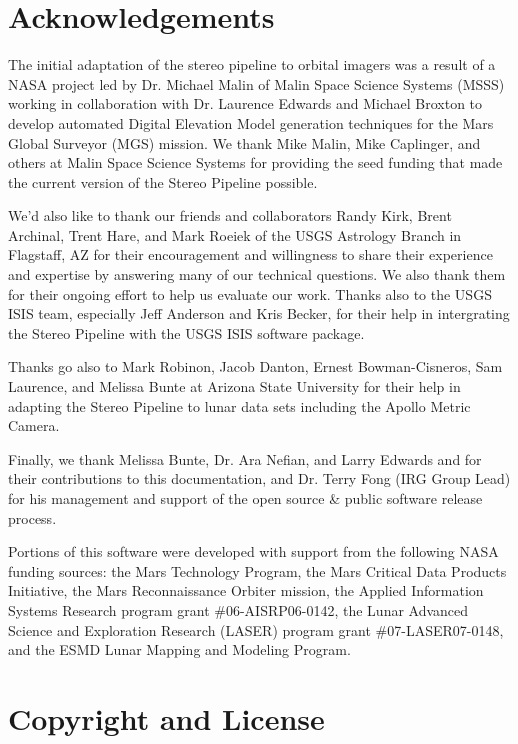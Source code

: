 \section*{Acknowledgements}

The initial adaptation of the stereo pipeline to orbital imagers was a
result of a NASA project led by Dr. Michael Malin of Malin Space
Science Systems (MSSS) working in collaboration with Dr. Laurence
Edwards and Michael Broxton to develop automated Digital Elevation
Model generation techniques for the Mars Global Surveyor (MGS)
mission.  We thank Mike Malin, Mike Caplinger, and others at Malin
Space Science Systems for providing the seed funding that made the
current version of the Stereo Pipeline possible.

We'd also like to thank our friends and collaborators Randy Kirk,
Brent Archinal, Trent Hare, and Mark Roeiek of the USGS Astrology
Branch in Flagstaff, AZ for their encouragement and willingness to
share their experience and expertise by answering many of our
technical questions.  We also thank them for their ongoing effort to
help us evaluate our work.  Thanks also to the USGS ISIS team,
especially Jeff Anderson and Kris Becker, for their help in
intergrating the Stereo Pipeline with the USGS ISIS software package.

Thanks go also to Mark Robinon, Jacob Danton, Ernest Bowman-Cisneros,
Sam Laurence, and Melissa Bunte at Arizona State University for their
help in adapting the Stereo Pipeline to lunar data sets including the
Apollo Metric Camera.

Finally, we thank Melissa Bunte, Dr. Ara Nefian, and Larry Edwards and
for their contributions to this documentation, and Dr. Terry Fong (IRG
Group Lead) for his management and support of the open source \& public
software release process.

Portions of this software were developed with support from the
following NASA funding sources: the Mars Technology Program, the Mars
Critical Data Products Initiative, the Mars Reconnaissance Orbiter
mission, the Applied Information Systems Research program grant
\#06-AISRP06-0142, the Lunar Advanced Science and Exploration Research
(LASER) program grant \#07-LASER07-0148, and the ESMD Lunar Mapping and
Modeling Program.

\section*{Copyright and License}

